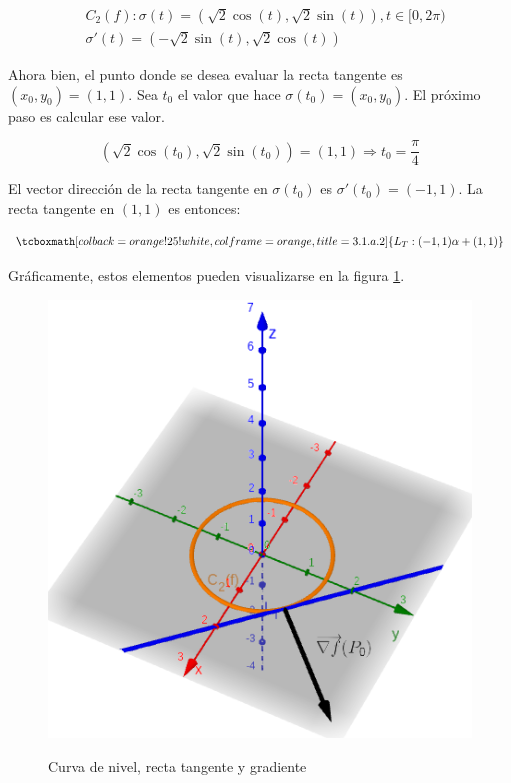\documentclass{article}
\begin{document}
\begin{subequations}
\begin{align}
& C_2(f): \sigma(t) = (\sqrt{2} \cos(t), \sqrt{2} \sin(t)), t \in [0, 2\pi) \\
& \sigma'(t) = (-\sqrt{2} \sin(t), \sqrt{2} \cos(t))
\end{align}
\end{subequations}

Ahora bien, el punto donde se desea evaluar la recta tangente es $(x_0, y_0) = (1, 1)$. Sea $t_0$ el valor que hace $\sigma(t_0) = (x_0, y_0)$. El próximo paso es calcular ese valor.

\begin{equation}
(\sqrt{2} \cos(t_0), \sqrt{2} \sin(t_0)) = (1, 1) \Rightarrow t_0 = \frac{\pi}{4}
\end{equation}

El vector dirección de la recta tangente en $\sigma(t_0)$ es $\sigma'(t_0) = (-1, 1)$. La recta tangente en $(1, 1)$ es entonces:

\begin{equation}
\tcboxmath[colback=orange!25!white,colframe=orange,title=3.1.a.2]
{
L_T: (-1, 1) \alpha + (1, 1)
}
\end{equation}

Gráficamente, estos elementos pueden visualizarse en la figura \ref{fig:1-a-2}.

\begin{figure}[ht]
\caption{Curva de nivel, recta tangente y gradiente}
\includegraphics[scale=0.35]{img/ejercicios/3/1-a-2.png} 
\centering
\label{fig:1-a-2}
\end{figure}
\end{document}
